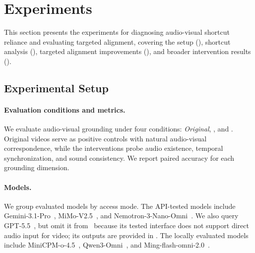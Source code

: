 
\vspace{-4pt}
\section{Experiments}
\label{sec:exp}

This section presents the experiments for diagnosing audio-visual shortcut reliance and evaluating targeted alignment, covering the setup (), shortcut analysis (), targeted alignment improvements (), and broader intervention results ().

\subsection{Experimental Setup}\label{ssec:setup}


\paragraph{Evaluation conditions and metrics.}
We evaluate audio-visual grounding under four conditions: \textit{Original}, \shift, \mute and \swap. Original videos serve as positive controls with natural audio-visual correspondence, while the interventions probe audio existence, temporal synchronization, and sound consistency. We report paired accuracy for each grounding dimension. 







\paragraph{Models.}
We group evaluated models by access mode. The API-tested models include Gemini-3.1-Pro~\cite{deepmind2026gemini3}, MiMo-V2.5~\cite{xiaomi2026mimov25}, and Nemotron-3-Nano-Omni~\cite{Deshmukh2026Nemotron3N}. We also query GPT-5.5~\cite{DBLP:journals/corr/abs-2601-03267}, but omit it from~ because its tested interface does not support direct audio input for video; its outputs are provided in . The locally evaluated models include MiniCPM-o-4.5~\cite{Cui2026MiniCPMo4T}, Qwen3-Omni~\cite{DBLP:journals/corr/abs-2509-17765}, and Ming-flash-omni-2.0~\cite{DBLP:journals/corr/abs-2506-09344}.



